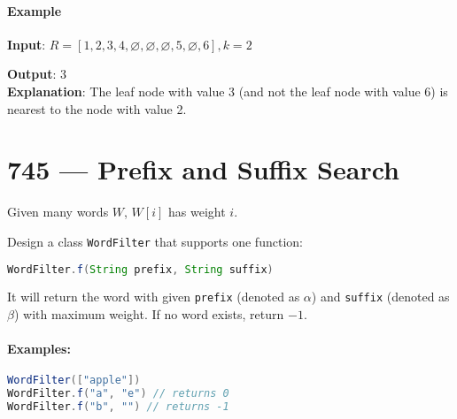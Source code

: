 \paragraph*{Example}
\begin{flushleft}
\textbf{Input}: $R = [1,2,3,4,\varnothing,\varnothing,\varnothing,5,\varnothing,6], k = 2$
\begin{figure}[H]
\end{figure}
\textbf{Output}: 3
\\
\textbf{Explanation}: The leaf node with value 3 (and not the leaf node with value 6) is nearest to the node with value 2.
\end{flushleft}

\section{745 --- Prefix and Suffix Search}
Given many words $W$, $W[i]$ has weight $i$.
\par
Design a class \texttt{WordFilter} that supports one function:
\begin{lstlisting}[backgroundcolor=\color{blue!80!green!10}, keywordstyle=\bfseries\color{green!40!black}, commentstyle=\itshape\color{purple!40!black},language=Java]
WordFilter.f(String prefix, String suffix)
\end{lstlisting}
It will return the word with given \texttt{prefix} (denoted as $\alpha$) and \texttt{suffix} (denoted as $\beta$) with maximum weight. If no word exists, return $-1$.
\paragraph{Examples:}
\begin{flushleft}
\begin{lstlisting}[backgroundcolor=\color{blue!80!green!10}, keywordstyle=\bfseries\color{green!40!black}, commentstyle=\itshape\color{purple!40!black},language=Java]
WordFilter(["apple"])
WordFilter.f("a", "e") // returns 0
WordFilter.f("b", "") // returns -1
\end{lstlisting}
\end{flushleft}
